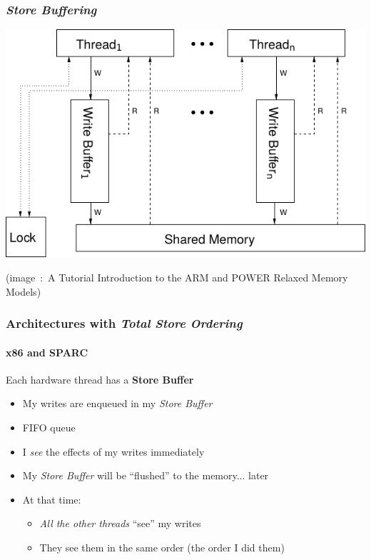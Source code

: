 \documentclass[xcolor={x11names,svgnames},x11names,svgnames]{beamer}
\begin{document}

\begin{frame}[label=tso]
  \frametitle{\emph{Store Buffering}}
  
  \centering
  \includegraphics[width=\textwidth]{tso}

  \medskip
  
  \scriptsize (image~:~A Tutorial
    Introduction to the ARM and POWER Relaxed Memory Models)
\end{frame}


\begin{frame}[label=tso]
  \frametitle{Architectures with \emph{Total Store Ordering}}
  \framesubtitle{x86 and SPARC}
  
  \begin{block}{Each \alert{hardware} thread has a \textbf{Store Buffer}}
    \begin{itemize}
    \item My writes are enqueued in my \emph{Store Buffer}
    \item FIFO queue
    \item I \emph{see} the effects of my writes immediately
    \item My \emph{Store Buffer} \alert{will} be ``flushed'' to the memory... later
    \item At that time:
      \begin{itemize}
      \item  \emph{All the other threads} ``see'' my writes
      \item They see them in the same order (the order I did them)
      \end{itemize}
    \end{itemize}
  \end{block}
\end{frame}
\end{document}
